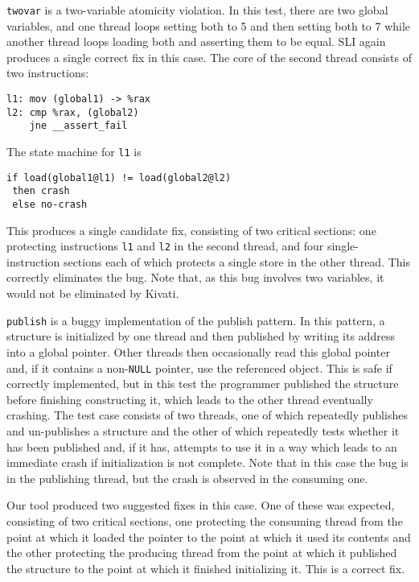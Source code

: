 \documentclass[10pt,twocolumn,preprint,natbib,authoryear]{sigplanconf}
\begin{document}
\verb|twovar| is a two-variable atomicity violation.  In this test,
there are two global variables, and one thread loops setting both to 5
and then setting both to 7 while another thread loops loading both and
asserting them to be equal.  SLI again produces a single correct fix
in this case.  The core of the second thread consists of two
instructions:

\begin{verbatim}
l1: mov (global1) -> %rax
l2: cmp %rax, (global2)
    jne __assert_fail
\end{verbatim}

The state machine for \verb|l1| is

\begin{verbatim}
if load(global1@l1) != load(global2@l2)
 then crash
 else no-crash
\end{verbatim}

\noindent
This produces a single candidate fix, consisting of two critical
sections: one protecting instructions \verb|l1| and \verb|l2| in the
second thread, and four single-instruction sections each of which
protects a single store in the other thread.  This correctly
eliminates the bug.  Note that, as this bug involves two variables, it
would not be eliminated by Kivati\cite{Chew2010a}.

\verb|publish| is a buggy implementation of the publish pattern.  In
this pattern, a structure is initialized by one thread and then
published by writing its address into a global pointer.  Other threads
then occasionally read this global pointer and, if it contains a
non-\verb|NULL| pointer, use the referenced object.  This is safe if
correctly implemented, but in this test the programmer published the
structure before finishing constructing it, which leads to the other
thread eventually crashing.  The test case consists of two threads,
one of which repeatedly publishes and un-publishes a structure and the
other of which repeatedly tests whether it has been published and, if
it has, attempts to use it in a way which leads to an immediate crash
if initialization is not complete.  Note that in this case the bug is
in the publishing thread, but the crash is observed in the consuming
one.

Our tool produced two suggested fixes in this case.  One of these was
expected, consisting of two critical sections, one protecting the
consuming thread from the point at which it loaded the pointer to the
point at which it used its contents and the other protecting the
producing thread from the point at which it published the structure to
the point at which it finished initializing it.  This is a correct
fix.
\end{document}
